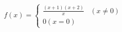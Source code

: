 \begin{displaymath}
f(x) = \left\{ \begin{array}{l}
\displaystyle \frac{( x + 1 )( x + 2 )}{x} \;\;\; ( x \neq 0 ) \\
0  ( x = 0 )
\end{array} \right.
\end{displaymath}

